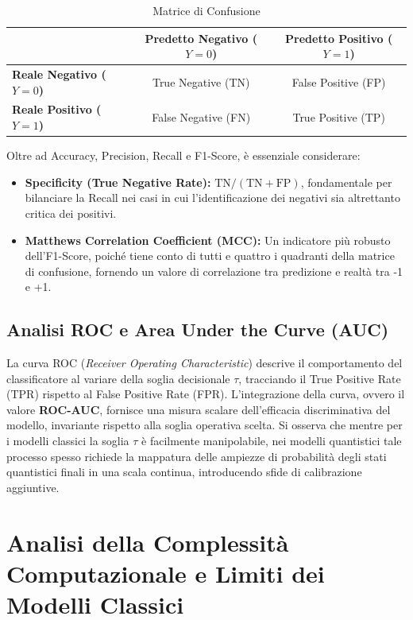 \begin{table}[h]
\centering
\caption{Matrice di Confusione}
\label{tab:matrice_confusione}
\begin{tabular}{l|c|c}
\hline
& \textbf{Predetto Negativo ($Y=0$)} & \textbf{Predetto Positivo ($Y=1$)} \\
\hline
\textbf{Reale Negativo ($Y=0$)} & True Negative (TN) & False Positive (FP) \\
\textbf{Reale Positivo ($Y=1$)} & False Negative (FN) & True Positive (TP) \\
\hline
\end{tabular}
\end{table}

Oltre ad Accuracy, Precision, Recall e F1-Score, è essenziale considerare:
\begin{itemize}
    \item \textbf{Specificity (True Negative Rate):} $\text{TN} / (\text{TN} + \text{FP})$, fondamentale per bilanciare la Recall nei casi in cui l'identificazione dei negativi sia altrettanto critica dei positivi.
    \item \textbf{Matthews Correlation Coefficient (MCC):} Un indicatore più robusto dell'F1-Score, poiché tiene conto di tutti e quattro i quadranti della matrice di confusione, fornendo un valore di correlazione tra predizione e realtà tra -1 e +1.
\end{itemize}

\subsection{Analisi ROC e Area Under the Curve (AUC)}
La curva ROC (\textit{Receiver Operating Characteristic}) descrive il comportamento del classificatore al variare della soglia decisionale $\tau$, tracciando il True Positive Rate (TPR) rispetto al False Positive Rate (FPR). L'integrazione della curva, ovvero il valore \textbf{ROC-AUC}, fornisce una misura scalare dell'efficacia discriminativa del modello, invariante rispetto alla soglia operativa scelta.
Si osserva che mentre per i modelli classici la soglia $\tau$ è facilmente manipolabile, nei modelli quantistici tale processo spesso richiede la mappatura delle ampiezze di probabilità degli stati quantistici finali in una scala continua, introducendo sfide di calibrazione aggiuntive.

\section{Analisi della Complessità Computazionale e Limiti dei Modelli Classici}

